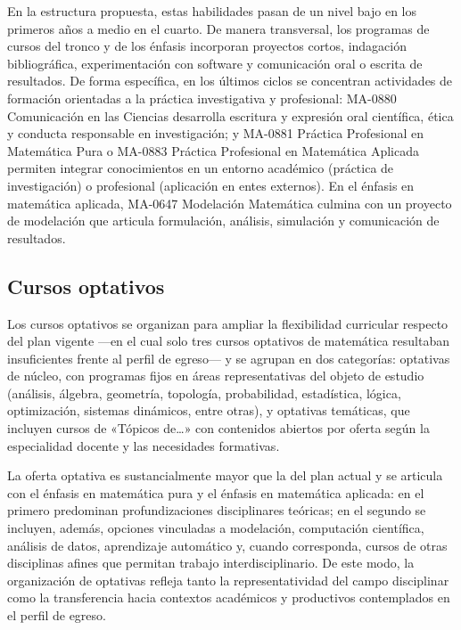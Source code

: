 \begin{refsection}
En la estructura propuesta, estas habilidades pasan de un nivel bajo en los primeros años a medio en el cuarto. De manera transversal, los programas de cursos del tronco y de los énfasis incorporan proyectos cortos, indagación bibliográfica, experimentación con software y comunicación oral o escrita de resultados. De forma específica, en los últimos ciclos se concentran actividades de formación orientadas a la práctica investigativa y profesional: MA-0880 Comunicación en las Ciencias desarrolla escritura y expresión oral científica, ética y conducta responsable en investigación; y MA-0881 Práctica Profesional en Matemática Pura o MA-0883 Práctica Profesional en Matemática Aplicada permiten integrar conocimientos en un entorno académico (práctica de investigación) o profesional (aplicación en entes externos). En el énfasis en matemática aplicada, MA-0647 Modelación Matemática culmina con un proyecto de modelación que articula formulación, análisis, simulación y comunicación de resultados.

\subsection{Cursos optativos}

Los cursos optativos se organizan para ampliar la flexibilidad curricular respecto del plan vigente ---en el cual solo tres cursos optativos de matemática resultaban insuficientes frente al perfil de egreso--- y se agrupan en dos categorías: optativas de núcleo, con programas fijos en áreas representativas del objeto de estudio (análisis, álgebra, geometría, topología, probabilidad, estadística, lógica, optimización, sistemas dinámicos, entre otras), y optativas temáticas, que incluyen cursos de «Tópicos de\ldots» con contenidos abiertos por oferta según la especialidad docente y las necesidades formativas.

La oferta optativa es sustancialmente mayor que la del plan actual y se articula con el énfasis en matemática pura y el énfasis en matemática aplicada: en el primero predominan profundizaciones disciplinares teóricas; en el segundo se incluyen, además, opciones vinculadas a modelación, computación científica, análisis de datos, aprendizaje automático y, cuando corresponda, cursos de otras disciplinas afines que permitan trabajo interdisciplinario. De este modo, la organización de optativas refleja tanto la representatividad del campo disciplinar como la transferencia hacia contextos académicos y productivos contemplados en el perfil de egreso.


\end{refsection}
